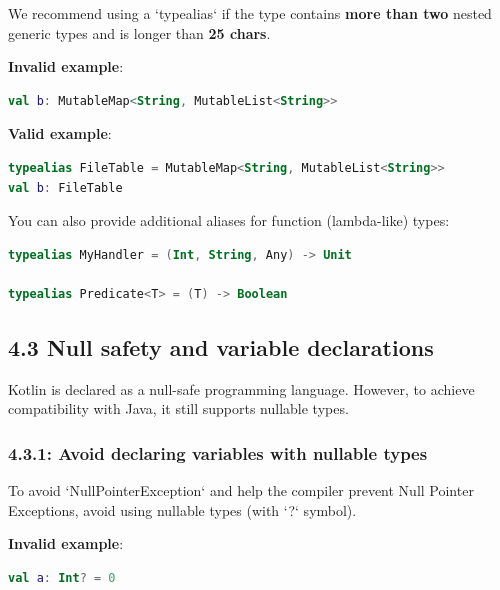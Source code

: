{{{{We recommend using a `typealias` if the type contains \textbf{more than two} nested generic types and is longer than \textbf{25 chars}.



\textbf{Invalid example}:

\begin{lstlisting}[language=Kotlin]
val b: MutableMap<String, MutableList<String>>
\end{lstlisting}


\textbf{Valid example}:

\begin{lstlisting}[language=Kotlin]
typealias FileTable = MutableMap<String, MutableList<String>>
val b: FileTable
\end{lstlisting}


You can also provide additional aliases for function (lambda-like) types:

\begin{lstlisting}[language=Kotlin]
typealias MyHandler = (Int, String, Any) -> Unit

typealias Predicate<T> = (T) -> Boolean
\end{lstlisting}


\subsection*{\textbf{4.3 Null safety and variable declarations}}

\label{sec:4.3}

Kotlin is declared as a null-safe programming language. However, to achieve compatibility with Java, it still supports nullable types.



\subsubsection*{\textbf{4.3.1: Avoid declaring variables with nullable types}}
\leavevmode\newline

\label{sec:4.3.1}

To avoid `NullPointerException` and help the compiler prevent Null Pointer Exceptions, avoid using nullable types (with `?` symbol).



\textbf{Invalid example}:

\begin{lstlisting}[language=Kotlin]
val a: Int? = 0
\end{lstlisting}


}}}}
